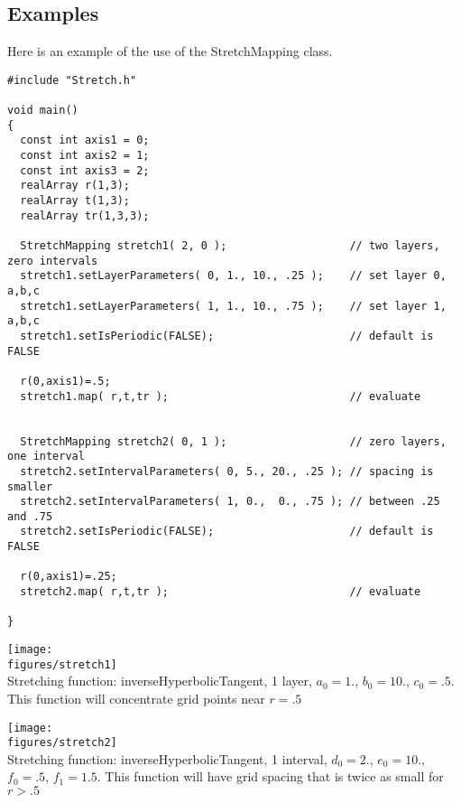 \subsection{Examples}

Here is an example of the use of the {\ff StretchMapping} class.
{\footnotesize
\begin{verbatim}
#include "Stretch.h"

void main()
{
  const int axis1 = 0;
  const int axis2 = 1;
  const int axis3 = 2;
  realArray r(1,3);
  realArray t(1,3);
  realArray tr(1,3,3);

  StretchMapping stretch1( 2, 0 );                   // two layers, zero intervals
  stretch1.setLayerParameters( 0, 1., 10., .25 );    // set layer 0, a,b,c
  stretch1.setLayerParameters( 1, 1., 10., .75 );    // set layer 1, a,b,c
  stretch1.setIsPeriodic(FALSE);                     // default is FALSE

  r(0,axis1)=.5;
  stretch1.map( r,t,tr );                            // evaluate


  StretchMapping stretch2( 0, 1 );                   // zero layers, one interval
  stretch2.setIntervalParameters( 0, 5., 20., .25 ); // spacing is smaller
  stretch2.setIntervalParameters( 1, 0.,  0., .75 ); // between .25 and .75
  stretch2.setIsPeriodic(FALSE);                     // default is FALSE
  
  r(0,axis1)=.25;
  stretch2.map( r,t,tr );                            // evaluate

}
\end{verbatim}
}

\noindent
\begin{minipage}{.475\linewidth}
  \begin{center}
   \texttt{[image: \\figures/stretch1]} \\
  {Stretching function: inverseHyperbolicTangent, 1 layer, $a_0=1.$, $b_0=10.$, $c_0=.5$. This function
    will concentrate grid points near $r=.5$} 
  \end{center}
\end{minipage}\hfill
\begin{minipage}{.475\linewidth}
  \begin{center}
   \texttt{[image: \\figures/stretch2]} \\
  {Stretching function: inverseHyperbolicTangent, 1 interval, $d_0=2.$, $e_0=10.$, $f_0=.5$, $f_1=1.5$.
    This function will have grid spacing that is twice as small for $r>.5$ } 
  \end{center}
\end{minipage}

